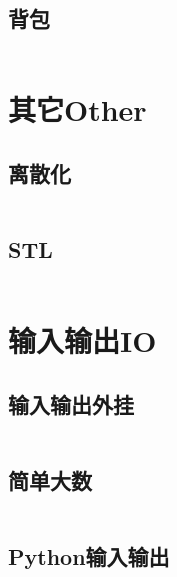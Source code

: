 \documentclass[twoside,sub3section,UTF8]{ctexart}						%
\begin{document}
	\subsection{背包}
	\inputminted{c++}{"Dynamic Programme/bag.cpp"}




\newpage
\section{其它Other}
	\subsection{离散化}
	\inputminted{c++}{"Other/discretization.cpp"}
	\subsection{STL}
	\inputminted{c++}{"Other/STL.cpp"}

\newpage
\section{输入输出IO}
	\subsection{输入输出外挂}
	\inputminted{c++}{"IO/IO.cpp"}
	\subsection{简单大数}
	\inputminted{c++}{"IO/BigInt.cpp"}
	\subsection{Python输入输出}
	\inputminted{python}{"IO/IO.py"}
\end{document}
